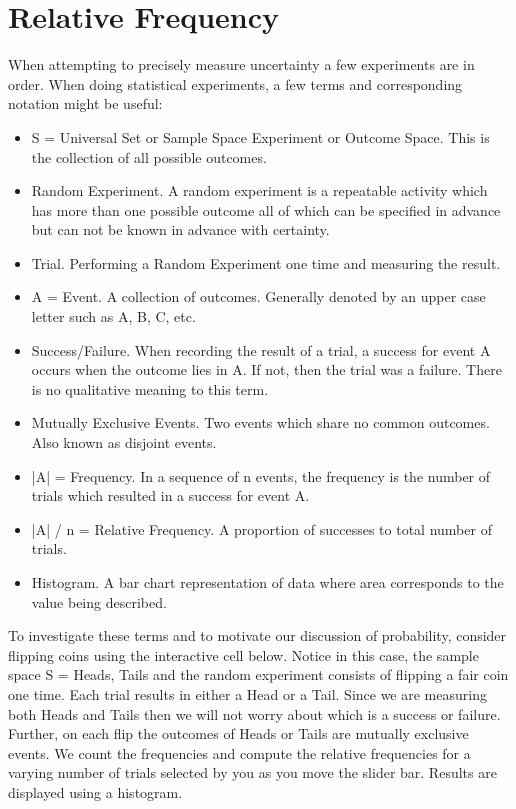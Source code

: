 \documentclass[10pt,]{book}
\theoremstyle{plain}
\theoremstyle{definition}
\theoremstyle{definition}
\theoremstyle{definition}
\numberwithin{equation}{section}
\begin{document}
\section[{Relative Frequency}]{Relative Frequency}\label{RelativeFrequency}
When attempting to precisely measure uncertainty a few experiments are in order. When doing statistical experiments, a few terms and corresponding notation might be useful:%
\leavevmode%
\begin{itemize}[label=\textbullet]
\item{}S = Universal Set or Sample Space Experiment or Outcome Space. 
		This is the collection of all possible outcomes.%
\item{}Random Experiment. A random experiment is a repeatable activity which has more than one
		possible outcome all of which can be specified in advance but can not be known in advance with certainty.%
\item{}Trial. Performing a Random Experiment one time and measuring the result.%
\item{}A = Event. A collection of outcomes.  Generally denoted by an upper case letter such as A, B, C, etc.%
\item{}Success/Failure. When recording the result of a trial, a success for event A occurs when the outcome
		lies in A. If not, then the trial was a failure. There is no qualitative meaning to this term.%
\item{}Mutually Exclusive Events. Two events which share no common outcomes. Also known as disjoint events.%
\item{}|A| = Frequency. In a sequence of n events, the frequency is the number of trials which resulted in 
		a success for event A.%
\item{}|A| / n = Relative Frequency. A proportion of successes to total number of trials.%
\item{}Histogram. A bar chart representation of data where area corresponds to the value being described.%
\end{itemize}
\par
To investigate these terms and to motivate our discussion of probability, consider flipping coins using the interactive cell below. Notice in this case, the sample space S = {Heads, Tails} and the random experiment consists of flipping a fair coin one time. Each trial results in either a Head or a Tail. Since we are measuring both Heads and Tails then we will not worry about which is a success or failure. Further, on each flip the outcomes of Heads or Tails are mutually exclusive events. We count the frequencies and compute the relative frequencies for a varying number of trials selected by you as you move the slider bar. Results are displayed using a histogram.%
\par
\end{document}
